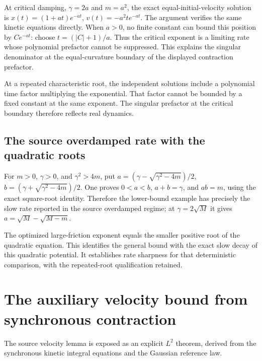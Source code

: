 \documentclass[11pt,a4paper]{report}
\begin{document}
At critical damping, \(\gamma=2a\) and \(m=a^2\), the exact equal-initial-velocity solution is \(x(t)=(1+at)e^{-at}\), \(v(t)=-a^2te^{-at}\). The argument verifies the same kinetic equations directly. When \(a>0\), no finite constant can bound this position by \(Ce^{-at}\): choose \(t=(|C|+1)/a\). Thus the critical exponent is a limiting rate whose polynomial prefactor cannot be suppressed. This explains the singular denominator at the equal-curvature boundary of the displayed contraction prefactor.



At a repeated characteristic root, the independent solutions include a polynomial time factor multiplying the exponential. That factor cannot be bounded by a fixed constant at the same exponent. The singular prefactor at the critical boundary therefore reflects real dynamics.

\subsection{\texorpdfstring{The source overdamped rate with the quadratic roots}{The source overdamped rate with the quadratic roots}}
\label{report-step-KineticLangevin-QuadraticSharpness-lean-4}


For \(m>0\), \(\gamma>0\), and \(\gamma^2>4m\), put \(a=(\gamma-\sqrt{\gamma^2-4m})/2\), \(b=(\gamma+\sqrt{\gamma^2-4m})/2\). One proves \(0<a<b\), \(a+b=\gamma\), and \(ab=m\), using the exact square-root identity. Therefore the lower-bound example has precisely the slow rate reported in the source overdamped regime; at \(\gamma=2\sqrt M\) it gives \(a=\sqrt M-\sqrt{M-m}\).



The optimized large-friction exponent equals the smaller positive root of the quadratic equation. This identifies the general bound with the exact slow decay of this quadratic potential. It establishes rate sharpness for that deterministic comparison, with the repeated-root qualification retained.

\section{\texorpdfstring{The auxiliary velocity bound from synchronous contraction}{The auxiliary velocity bound from synchronous contraction}}
\label{proof-module-KineticLangevin-AuxiliaryVelocity-lean}


The source velocity lemma is exposed as an explicit \(L^{2}\) theorem, derived from the synchronous kinetic integral equations and the Gaussian reference law.
\end{document}
